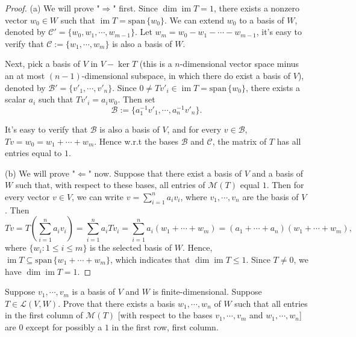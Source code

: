\documentclass{article}
\begin{document}
\begin{proof}
    (a) We will prove "\( \Rightarrow \)" first. Since \( \dim\operatorname{im } T=1 \), there exists a nonzero vector \( w_0\in W  \) such that \( \operatorname{im } T=\mathrm{span}\,\{w_0\} \). We can extend \( w_0 \) to a basis of \( W \), denoted by \( \mathcal{C'}=\{w_0,w_1,\cdots,w_{m-1}\} \). Let \( w_m=w_0-w_1-\cdots-w_{m-1} \), it's easy to verify that \( \mathcal{C }:=\{w_1,\cdots,w_m\} \) is also a basis of \( W \). \par
    Next, pick a basis of \( V \) in \( V-\ker T \) (this is a \( n \)-dimensional vector space minus an at most \( (n-1) \)-dimensional subspace, in which there do exist a basis of \( V \)), denoted by \( \mathcal{B'}=\{v'_1,\cdots,v'_n\} \). Since \( 0\neq T v'_i\in \operatorname{im } T=\mathrm{span}\,\{w_0\} \), there exists a scalar \( a_i \) such that \( T v'_i=a_i w_0 \). Then set
    \[ \mathcal{B}:=\{a_1^{-1}v'_1,\cdots,a_n^{-1}v'_n\}. \]\par
    It's easy to verify that \( \mathcal{B} \) is also a basis of \( V \), and for every \( v\in \mathcal{B} \), \( Tv=w_0=w_1+\cdots+w_m  \). Hence w.r.t the bases \( \mathcal{B} \) and \( \mathcal{C} \), the matrix of \( T  \) has all entries equal to \( 1 \). \par 
    (b) We will prove "\( \Leftarrow \)" now. Suppose that there exist a basis of \( V \) and a basis of \( W \) such that, with respect to these bases, all entries of \( \mathcal{M}(T) \) equal \(1\). Then for every vector \( v\in V  \), we can write \( v=\sum_{i=1}^n a_i v_i \), where \( v_1,\cdots,v_n \) are the basis of \( V \). Then
    \[ Tv=T\left(\sum_{i=1}^n a_i v_i\right)=\sum_{i=1}^n a_i Tv_i=\sum_{i=1}^n a_i (w_1+\cdots+w_m)=(a_1+\cdots+a_n)(w_1+\cdots+w_m), \]
    where \( \{w_i:1\le i\le m\} \) is the selected basis of \( W \). Hence, \( \operatorname{im } T\subseteq \mathrm{span}\,\{w_1+\cdots+w_m\} \), which indicates that \( \dim\operatorname{im } T\le 1 \). Since \( T\ne 0 \), we have \( \dim\operatorname{im } T=1 \).
\end{proof}

\begin{problem}[3C-6]
    Suppose \( v_1,\cdots,v_m \) is a basis of \( V \) and \( W \) is finite-dimensional. Suppose \( T\in\mathcal{L}(V,W) \). Prove that there exists a basis \( w_1,\cdots,w_n \) of \( W \) such that all entries in the first column of \( \mathcal{M}(T) \) [with respect to the bases \( v_1,\cdots,v_m \) and \( w_1,\cdots,w_n \)] are \(0\) except for possibly a \(1\) in the first row, first column.
\end{problem}
\end{document}
